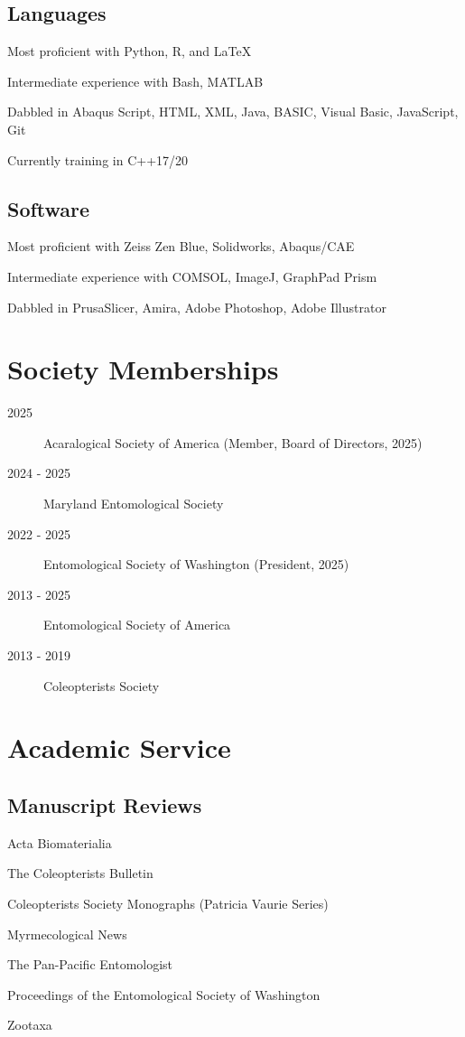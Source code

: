 \documentclass[12pt,a4paper]{article}
\begin{document}
\subsection*{Languages}
\begin{description}
	\item Most proficient with Python, R, and \LaTeX
	\item Intermediate experience with Bash, MATLAB
	\item Dabbled in Abaqus Script, HTML, XML, Java, BASIC, Visual Basic, JavaScript, Git
	\item Currently training in C++17/20
\end{description}

\subsection*{Software}
\begin{description}
	\item Most proficient with Zeiss Zen Blue, Solidworks, Abaqus/CAE
	\item Intermediate experience with COMSOL, ImageJ, GraphPad Prism
	\item Dabbled in PrusaSlicer, Amira, Adobe Photoshop, Adobe Illustrator
\end{description}


\section*{Society Memberships}
\begin{description}
	\item [2025] Acaralogical Society of America (Member, Board of Directors, 2025)
	\item [2024 - 2025] Maryland Entomological Society
	\item [2022 - 2025]	Entomological Society of Washington (President, 2025)
	\item [2013 - 2025] Entomological Society of America
	\item [2013 - 2019] Coleopterists Society
\end{description}

\section*{Academic Service}
\subsection*{Manuscript Reviews}
\begin{description}
	\item Acta Biomaterialia
	\item The Coleopterists Bulletin
	\item Coleopterists Society Monographs (Patricia Vaurie Series)
	\item Myrmecological News
	\item The Pan-Pacific Entomologist
	\item Proceedings of the Entomological Society of Washington
	\item Zootaxa
\end{description}
\end{document}
